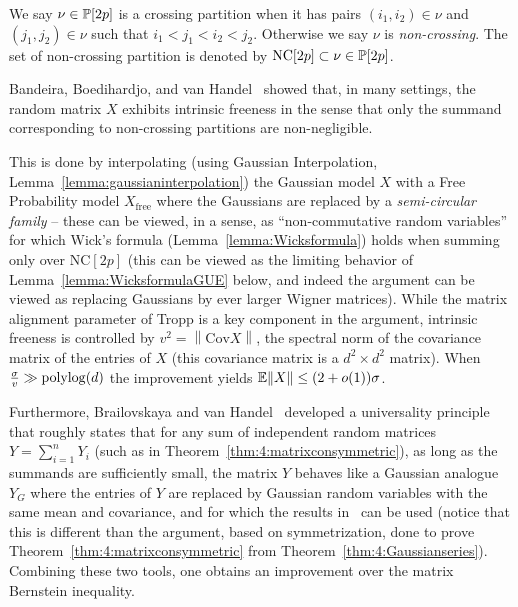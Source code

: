 \begin{definition}\label{partitions:crossing}
We say $\nu\in\mathbb{P}[2p]$ is a crossing partition when it has pairs $(i_1,i_2)\in\nu$ and $(j_1,j_2)\in\nu$ such that $i_1< j_1 < i_2 < j_2$. Otherwise we say $\nu$ is \emph{non-crossing}. The set of non-crossing partition is denoted by $\mathrm{NC}[2p]\subset \nu\in\mathbb{P}[2p]$.
\end{definition}

Bandeira, Boedihardjo, and van Handel~\cite{Bandeiraetal_FreeProbability} showed that, in many settings, the random matrix $X$ exhibits intrinsic freeness in the sense that only the summand corresponding to non-crossing partitions are non-negligible. 


This is done by interpolating (using Gaussian Interpolation, Lemma~\ref{lemma:gaussianinterpolation}) the Gaussian model $X$ with a Free Probability model $X_{\mathrm{free}}$ where the Gaussians are replaced by a \emph{semi-circular family} -- these can be viewed, in a sense, as ``non-commutative random variables'' for which Wick's formula (Lemma~\ref{lemma:Wicksformula}) holds when summing only over $\mathrm{NC}[2p]$ (this can be viewed as the limiting behavior of Lemma~\ref{lemma:WicksformulaGUE} below, and indeed the argument can be viewed as replacing Gaussians by ever larger Wigner matrices). While the matrix alignment parameter of Tropp is a key component in the argument, intrinsic freeness is controlled by $v^2=\left\| \mathrm{Cov} X \right\|$, the spectral norm of the covariance matrix of the entries of $X$ (this covariance matrix is a $d^2\times d^2$ matrix). When $\frac{\sigma}{v} \gg\mathrm{polylog}(d) $ the improvement yields $\mathbb{E}\|X\| \leq (2+o(1))\sigma$. 

Furthermore, Brailovskaya and van Handel~\cite{Tatianaetal_Universality}  developed a universality principle that roughly states that for any sum of independent random matrices  $Y = \sum_{i=1}^n Y_i$ (such as in Theorem~\ref{thm:4:matrixconsymmetric}), as long as the summands are sufficiently small, the matrix $Y$ behaves like a Gaussian analogue $Y_G$ where the entries of $Y$ are replaced by Gaussian random variables with the same mean and covariance, and for which the results in~\cite{Bandeiraetal_FreeProbability} can be used (notice that this is different than the argument, based on symmetrization, done to prove Theorem~\ref{thm:4:matrixconsymmetric} from Theorem~\ref{thm:4:Gaussianseries}). Combining these two tools, one obtains an improvement over the matrix Bernstein inequality.



